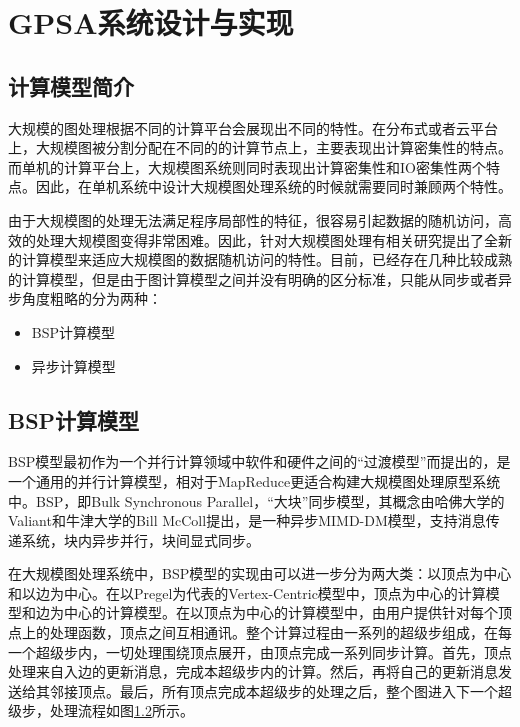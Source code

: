 
\chapter{GPSA系统设计与实现}

\section{计算模型简介}
大规模的图处理根据不同的计算平台会展现出不同的特性。在分布式或者云平台上，大规模图被分割分配在不同的的计算节点上，主要表现出计算密集性的特点。而单机的计算平台上，大规模图系统则同时表现出计算密集性和IO密集性两个特点。因此，在单机系统中设计大规模图处理系统的时候就需要同时兼顾两个特性。

由于大规模图的处理无法满足程序局部性的特征，很容易引起数据的随机访问，高效的处理大规模图变得非常困难。因此，针对大规模图处理有相关研究提出了全新的计算模型来适应大规模图的数据随机访问的特性。目前，已经存在几种比较成熟的计算模型，但是由于图计算模型之间并没有明确的区分标准，只能从同步或者异步角度粗略的分为两种：

\begin{itemize}
\item BSP计算模型
\item 异步计算模型
\end{itemize}

\section{BSP计算模型}

BSP模型最初作为一个并行计算领域中软件和硬件之间的“过渡模型”而提出的，是一个通用的并行计算模型，相对于MapReduce更适合构建大规模图处理原型系统中。BSP，即Bulk Synchronous Parallel，“大块”同步模型，其概念由哈佛大学的Valiant和牛津大学的Bill McColl提出，是一种异步MIMD-DM模型，支持消息传递系统，块内异步并行，块间显式同步。

在大规模图处理系统中，BSP模型的实现由可以进一步分为两大类：以顶点为中心和以边为中心。在以Pregel为代表的Vertex-Centric模型中，顶点为中心的计算模型和边为中心的计算模型。在以顶点为中心的计算模型中，由用户提供针对每个顶点上的处理函数，顶点之间互相通讯。整个计算过程由一系列的超级步组成，在每一个超级步内，一切处理围绕顶点展开，由顶点完成一系列同步计算。首先，顶点处理来自入边的更新消息，完成本超级步内的计算。然后，再将自己的更新消息发送给其邻接顶点。最后，所有顶点完成本超级步的处理之后，整个图进入下一个超级步，处理流程如图\ref{}所示。

